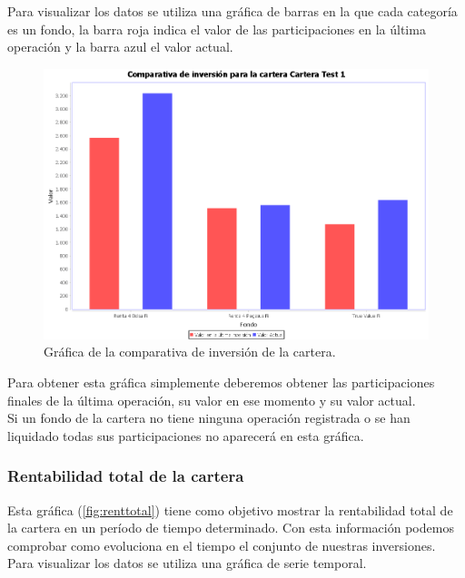 \documentclass[12pt, a4paper]{book}
\begin{document}
Para visualizar los datos se utiliza una gráfica de barras en la que cada categoría es un fondo, la barra roja indica el valor de las participaciones en la última operación y la barra azul el valor actual.

	\begin{figure}[htbp]
	\centering
	\includegraphics[width=\textwidth]{figuras/comparativa.PNG}
	\caption{Gráfica de la comparativa de inversión de la cartera.}
	\label{fig:comparativa}
	\end {figure}

Para obtener esta gráfica simplemente deberemos obtener las participaciones finales de la última operación, su valor en ese momento y su valor actual.\\ 

Si un fondo de la cartera no tiene ninguna operación registrada o se han liquidado todas sus participaciones no aparecerá en esta gráfica.

\newpage

\subsubsection{Rentabilidad total de la cartera}

Esta gráfica (\ref{fig:renttotal}) tiene como objetivo mostrar la rentabilidad total de la cartera en un período de tiempo determinado. Con esta información podemos comprobar como evoluciona en el tiempo el conjunto de nuestras inversiones.\\

Para visualizar los datos se utiliza una gráfica de serie temporal.
\end{document}

